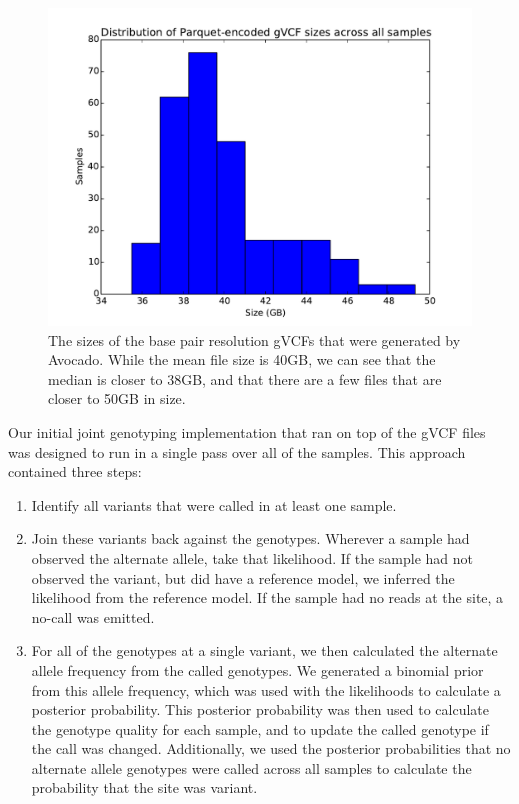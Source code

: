 \documentclass[phd]{ucbthesis}
\begin{document}
\begin{figure}[h]
  \begin{center}
    \includegraphics[width=0.95\linewidth]{graphs/gvcf_sizes.pdf}
  \end{center}
  \caption{The sizes of the base pair resolution gVCFs that were generated by
    Avocado. While the mean file size is 40GB, we can see that the median is
    closer to 38GB, and that there are a few files that are closer to 50GB in
    size.}
  \label{fig:gvcf-sizes}
\end{figure}

Our initial joint genotyping implementation that ran on top of the gVCF files
was designed to run in a single pass over all of the samples. This approach
contained three steps:

\begin{enumerate}
\item Identify all variants that were called in at least one sample.
\item Join these variants back against the genotypes. Wherever a sample had
  observed the alternate allele, take that likelihood. If the sample had not
  observed the variant, but did have a reference model, we inferred the
  likelihood from the reference model. If the sample had no reads at the site,
  a no-call was emitted.
\item For all of the genotypes at a single variant, we then calculated the
  alternate allele frequency from the called genotypes. We generated a binomial
  prior from this allele frequency, which was used with the likelihoods to
  calculate a posterior probability. This posterior probability was then used to
  calculate the genotype quality for each sample, and to update the called
  genotype if the call was changed. Additionally, we used the posterior
  probabilities that no alternate allele genotypes were called across all
  samples to calculate the probability that the site was variant.
\end{enumerate}
\end{document}
